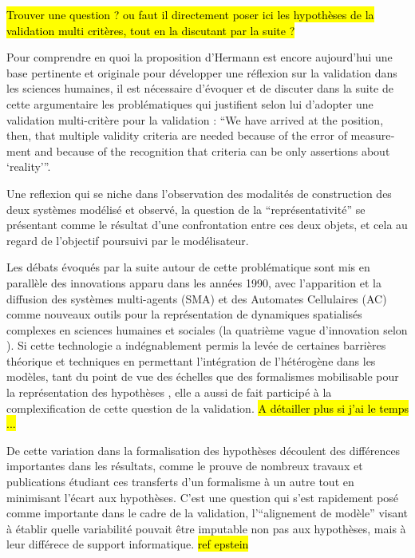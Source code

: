 \hl{Trouver une question ? ou faut il directement poser ici les hypothèses de la validation multi critères, tout en la discutant par la suite ? }

Pour comprendre en quoi la proposition d'Hermann est encore aujourd'hui une base pertinente et originale pour développer une réflexion sur la validation dans les sciences humaines, il est nécessaire d'évoquer et de discuter dans la suite de cette argumentaire les problématiques qui justifient selon lui d'adopter une validation multi-critère pour la validation : \foreignquote{english}{We have arrived at the position, then, that multiple validity criteria are needed because of the error of measurement and because of the recognition that criteria can be only assertions about \enquote{reality}}. 

Une reflexion qui se niche dans l'observation des modalités de construction des deux systèmes modélisé et observé, la question de la \enquote{représentativité} se présentant comme le résultat d'une confrontation entre ces deux objets, et cela au regard de l'objectif poursuivi par le modélisateur.

Les débats évoqués par la suite autour de cette problématique sont mis en parallèle des innovations apparu dans les années 1990, avec l'apparition et la diffusion des systèmes multi-agents (SMA) et des Automates Cellulaires (AC) comme nouveaux outils pour la représentation de dynamiques spatialisés complexes en sciences humaines et sociales (la quatrième vague d'innovation selon \autocite{Banos2013a}). Si cette technologie a indégnablement permis la levée de certaines barrières théorique et techniques en permettant l'intégration de l'hétérogène dans les modèles, tant du point de vue des échelles que des formalismes mobilisable pour la représentation des hypothèses , elle a aussi de fait participé à la complexification de cette question de la validation. \autocite[38-41]{Varenne2013} \hl{A détailler plus si j'ai le temps ... }

De cette variation dans la formalisation des hypothèses découlent des différences importantes dans les résultats, comme le prouve de nombreux travaux et publications étudiant ces transferts d'un formalisme à un autre tout en minimisant l'écart aux hypothèses. C'est une question qui s'est rapidement posé comme importante dans le cadre de la validation, l'\enquote{alignement de modèle} visant à établir quelle variabilité pouvait être imputable non pas aux hypothèses, mais à leur différece de support informatique. \hl{ref epstein}

